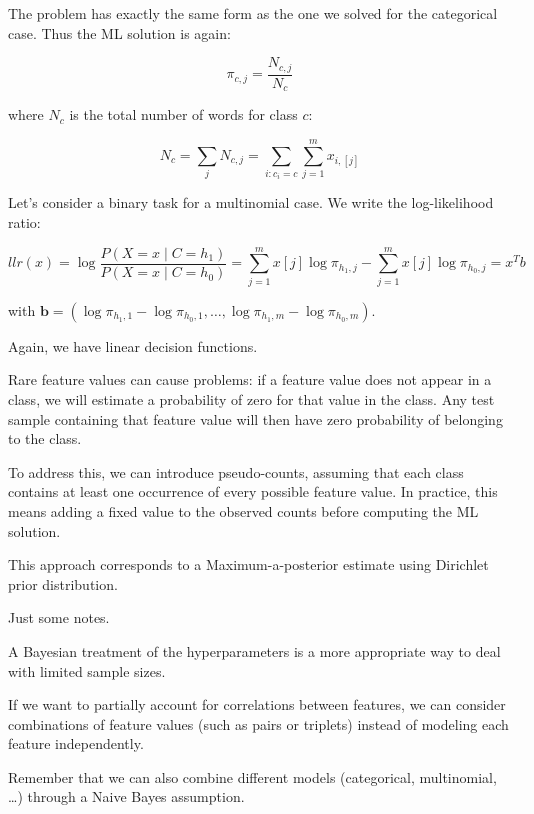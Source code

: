 The problem has exactly the same form as the one we solved for the categorical case. Thus the ML solution is again:

\begin{equation*}
\pi_{c,j} = \frac{N_{c,j}}{N_c}
\end{equation*}

where $N_c$ is the total number of words for class $c$:

\begin{equation*}
N_c = \sum_j N_{c,j} = \sum_{i: c_i = c} \sum_{j=1}^m x_{i,[j]}
\end{equation*}

Let's consider a binary task for a multinomial case. We write the log-likelihood ratio:

\begin{equation*}
llr(x) = \log \frac{P(X = x \mid C = h_1)}{P(X = x \mid C = h_0)} = \sum_{j=1}^m x[j] \log \pi_{h_1, j} - \sum_{j=1}^m x[j] \log \pi_{h_0, j} = x^T b
\end{equation*}

with $\mathbf{b} = (\log \pi_{h_1,1} - \log \pi_{h_0,1}, \ldots, \log \pi_{h_1,m} - \log \pi_{h_0,m})$.

Again, we have linear decision functions.

Rare feature values can cause problems: if a feature value does not appear in a class, we will estimate a probability of zero for that value in the class. Any test sample containing that feature value will then have zero probability of belonging to the class.

To address this, we can introduce pseudo-counts, assuming that each class contains at least one occurrence of every possible feature value. In practice, this means adding a fixed value to the observed counts before computing the ML solution.

This approach corresponds to a Maximum-a-posterior estimate using Dirichlet prior distribution.


Just some notes.

A Bayesian treatment of the hyperparameters is a more appropriate way to deal with limited sample sizes.

If we want to partially account for correlations between features, we can consider combinations of feature values (such as pairs or triplets) instead of modeling each feature independently.

Remember that we can also combine different models (categorical, multinomial, …) through a Naive Bayes assumption.

